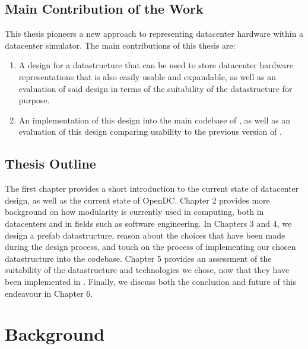 \documentclass[11pt]{article}
\begin{document}
	\subsection{Main Contribution of the Work}
		This thesis pioneers a new approach to representing datacenter hardware within a datacenter simulator.
		The main contributions of this thesis are:
		\begin{enumerate}
			\item A design for a datastructure that can be used to store datacenter hardware representations that is also easily usable and expandable, as well as an evaluation of said design in terms of the suitability of the datastructure for purpose.
			\item An implementation of this design into the main codebase of \opendc{}, as well as an evaluation of this design comparing usability to the previous version of \opendc{}.
		\end{enumerate}
	
	\subsection{Thesis Outline}
		The first chapter provides a short introduction to the current state of datacenter design, as well as the current state of OpenDC. 
		Chapter 2 provides more background on how modularity is currently used in computing, both in datacenters and in fields such as software engineering. 
		In Chapters 3 and 4, we design a prefab datastructure, reason about the choices that have been made during the design process, and touch on the process of implementing our chosen datastructure into the \opendc{} codebase.
		Chapter 5 provides an assessment of the suitability of the datastructure and technologies we chose, now that they have been implemented in \opendc{}.
		Finally, we discuss both the conclusion and future of this endeavour in Chapter 6.
	

	

\newpage

\section{Background} \label{sec:background}
\end{document}
